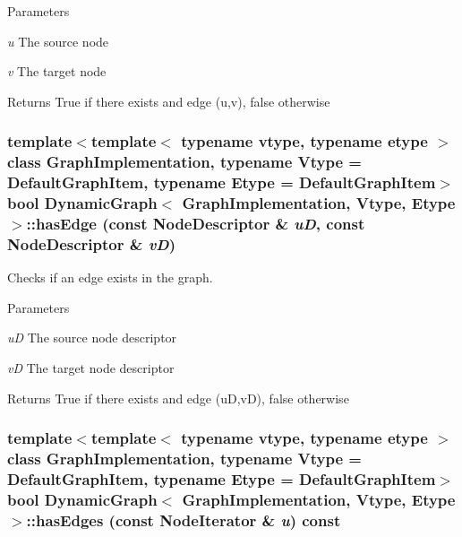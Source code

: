 \begin{DoxyParams}{Parameters}
\item[{\em u}]The source node \item[{\em v}]The target node \end{DoxyParams}
\begin{DoxyReturn}{Returns}
True if there exists and edge (u,v), false otherwise 
\end{DoxyReturn}
\hypertarget{class_dynamic_graph_a90e4a5161f28877b5723924bd9a290fe}{
\subsubsection[{hasEdge}]{\setlength{\rightskip}{0pt plus 5cm}template$<$template$<$ typename vtype, typename etype $>$ class GraphImplementation, typename Vtype  = DefaultGraphItem, typename Etype  = DefaultGraphItem$>$ bool {\bf DynamicGraph}$<$ GraphImplementation, Vtype, Etype $>$::hasEdge (const NodeDescriptor \& {\em uD}, \/  const NodeDescriptor \& {\em vD})}}
\label{class_dynamic_graph_a90e4a5161f28877b5723924bd9a290fe}


Checks if an edge exists in the graph. 


\begin{DoxyParams}{Parameters}
\item[{\em uD}]The source node descriptor \item[{\em vD}]The target node descriptor \end{DoxyParams}
\begin{DoxyReturn}{Returns}
True if there exists and edge (uD,vD), false otherwise 
\end{DoxyReturn}
\hypertarget{class_dynamic_graph_a6adc3ab6d95d3d2e6c8ca8d3b4238a39}{
\subsubsection[{hasEdges}]{\setlength{\rightskip}{0pt plus 5cm}template$<$template$<$ typename vtype, typename etype $>$ class GraphImplementation, typename Vtype  = DefaultGraphItem, typename Etype  = DefaultGraphItem$>$ bool {\bf DynamicGraph}$<$ GraphImplementation, Vtype, Etype $>$::hasEdges (const NodeIterator \& {\em u}) const}}
\label{class_dynamic_graph_a6adc3ab6d95d3d2e6c8ca8d3b4238a39}



